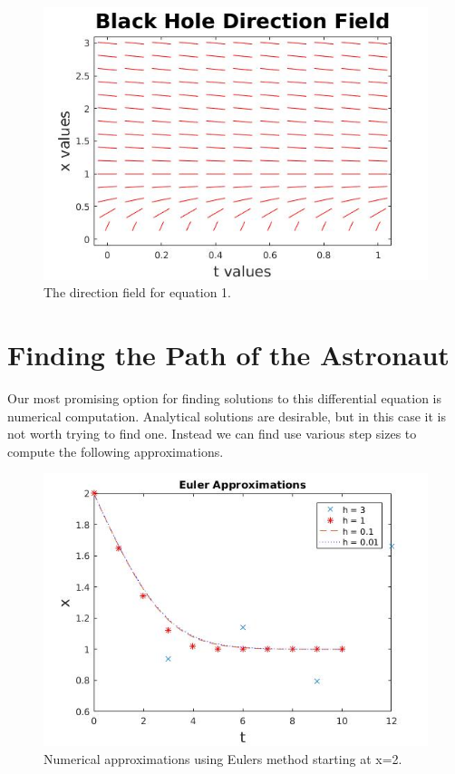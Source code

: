 \documentclass[11pt,english]{article}
\begin{document}
\begin{figure}[H]
  \includegraphics[width=\linewidth]{DirectionField.jpg}
  \caption{The direction field for equation 1.}
  \label{fig:dirfield1}
\end{figure}

\section*{Finding the Path of the Astronaut}

Our most promising option for finding solutions to this differential equation is numerical computation. Analytical solutions are desirable, but in this case it is not worth trying to find one. Instead we can find use various step sizes to compute the following approximations.

\begin{figure}[H]
  \includegraphics[width=\linewidth]{EulerPlots.jpg}
  \caption{Numerical approximations using Euler\textquotesingle s method starting at x=2.}
  \label{fig:euler1}
\end{figure}
\end{document}
